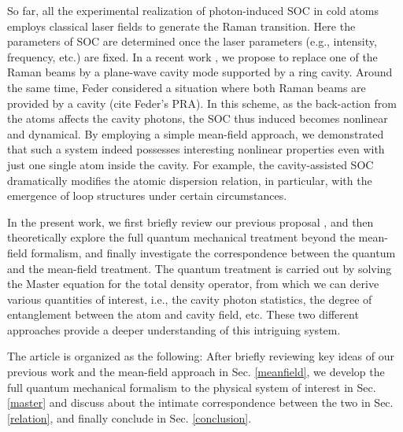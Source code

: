 \documentclass[atoms,article,submit,moreauthors,pdftex,12pt,a4paper]{mdpi}
\begin{document}
So far, all the experimental realization of photon-induced SOC in cold atoms employs classical laser fields to generate the Raman transition. Here the parameters of SOC are determined once the laser parameters (e.g., intensity, frequency, etc.) are fixed. In a recent work \cite{cavitySOC}, we propose to replace one of the Raman beams by a plane-wave cavity mode supported by a ring cavity. Around the same time, Feder considered a situation where both Raman beams are provided by a cavity (cite Feder's PRA). In this scheme, as the back-action from the atoms affects the cavity photons, the SOC thus induced becomes nonlinear and dynamical. By employing a simple mean-field approach, we demonstrated \cite{cavitySOC} that such a system indeed possesses interesting nonlinear properties even with just one single atom inside the cavity. For example, the cavity-assisted SOC dramatically modifies the atomic dispersion relation, in particular, with the emergence of loop structures under certain circumstances.
  
In the present work, we first briefly review our previous proposal \cite{cavitySOC}, and then theoretically explore the full quantum mechanical treatment beyond the mean-field formalism, and finally investigate the correspondence between the quantum and the mean-field treatment. The quantum treatment is carried out by solving the Master equation for the total density operator, from which we can derive various quantities of interest, i.e., the cavity photon statistics, the degree of entanglement between the atom and cavity field, etc. These two different approaches provide a deeper understanding of this intriguing system. 

The article is organized as the following: After briefly reviewing key ideas of our previous work and the mean-field approach in Sec. \ref{meanfield}, we develop the full quantum mechanical formalism to the physical system of interest in Sec. \ref{master} and discuss about the intimate correspondence between the two in Sec. \ref{relation}, and finally conclude in Sec. \ref{conclusion}. 
\end{document}
